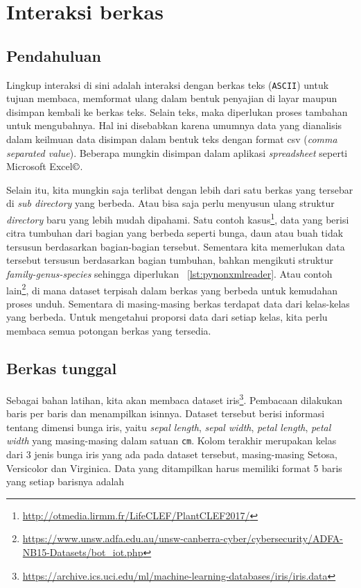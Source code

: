 \chapter{Interaksi berkas}
\section{Pendahuluan}
Lingkup interaksi di sini adalah interaksi dengan berkas teks (\texttt{ASCII}) untuk tujuan membaca, memformat ulang dalam bentuk penyajian di layar maupun disimpan kembali ke berkas teks. Selain teks, maka diperlukan proses tambahan untuk mengubahnya. Hal ini disebabkan karena umumnya data yang dianalisis dalam keilmuan data disimpan dalam bentuk teks dengan format csv (\textit{comma separated value}). Beberapa mungkin disimpan dalam aplikasi \textit{spreadsheet} seperti Microsoft Excel$\copyright$. 

Selain itu, kita mungkin saja terlibat dengan lebih dari satu berkas yang tersebar di \textit{sub directory}  yang berbeda. Atau bisa saja perlu menyusun ulang struktur \textit{directory} baru yang lebih mudah dipahami. Satu contoh kasus\footnote{\url{http://otmedia.lirmm.fr/LifeCLEF/PlantCLEF2017/}}, data yang berisi citra tumbuhan dari bagian yang berbeda seperti bunga, daun atau buah tidak tersusun berdasarkan bagian-bagian tersebut. Sementara kita memerlukan data tersebut tersusun berdasarkan bagian tumbuhan, bahkan mengikuti struktur \textit{family-genus-species} sehingga diperlukan \lstlistingname~\ref{lst:pynonxmlreader}. Atau contoh lain\footnote{\url{https://www.unsw.adfa.edu.au/unsw-canberra-cyber/cybersecurity/ADFA-NB15-Datasets/bot\_iot.php}}, di mana dataset terpisah dalam berkas yang berbeda untuk kemudahan proses unduh. Sementara di masing-masing berkas terdapat data dari kelas-kelas yang berbeda. Untuk mengetahui proporsi data dari setiap kelas, kita perlu membaca semua potongan berkas yang tersedia.

\scriptsize

\normalsize

\section{Berkas tunggal}
Sebagai bahan latihan, kita akan membaca dataset iris\footnote{\url{https://archive.ics.uci.edu/ml/machine-learning-databases/iris/iris.data}}. Pembacaan dilakukan baris per baris dan menampilkan isinnya. Dataset tersebut berisi informasi tentang dimensi bunga iris, yaitu \textit{sepal length}, \textit{sepal width}, \textit{petal length}, \textit{petal width} yang masing-masing dalam satuan \texttt{cm}. Kolom terakhir merupakan kelas dari 3 jenis bunga iris yang ada pada dataset tersebut, masing-masing Setosa, Versicolor dan Virginica. Data yang ditampilkan harus memiliki format 5 baris yang setiap barisnya adalah

